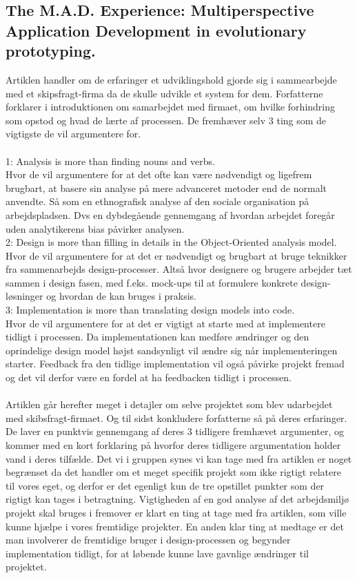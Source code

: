 \documentclass[12pt]{article}
\begin{document}
\subsection*{The M.A.D. Experience: Multiperspective Application Development in evolutionary prototyping.}

Artiklen handler om de erfaringer et udviklingshold gjorde sig i sammearbejde med et skipsfragt-firma da de skulle udvikle et system for dem. Forfatterne forklarer i introduktionen om samarbejdet med firmaet, om hvilke forhindring som opstod og hvad de lærte af processen. De fremhæver selv 3 ting som de vigtigste de vil argumentere for.\\\\
1: Analysis is more than finding nouns and verbs.\\
Hvor de vil argumentere for at det ofte kan være nødvendigt og ligefrem brugbart, at basere sin analyse på mere advanceret metoder end de normalt anvendte. Så som en ethnografisk analyse af den sociale organisation på arbejdspladsen. Dvs en dybdegående gennemgang af hvordan arbejdet foregår uden analytikerens bias påvirker analysen.\\
2: Design is more than filling in details in the Object-Oriented analysis model.\\
Hvor de vil argumentere for at det er nødvendigt og brugbart at bruge teknikker fra sammenarbejds design-processer. Altså hvor designere og brugere arbejder tæt sammen i design fasen, med f.eks. mock-ups til at formulere konkrete design-løsninger og hvordan de kan bruges i praksis.\\
3: Implementation is more than translating design models into code.\\
Hvor de vil argumentere for at  det er vigtigt at starte med at implementere tidligt i processen. Da implementationen kan medføre ændringer og den oprindelige design model højst sandsynligt vil ændre sig når implementeringen starter. Feedback fra den tidlige implementation vil også påvirke projekt fremad og det vil derfor være en fordel at ha feedbacken tidligt i processen.\\\\
Artiklen går herefter meget i detajler om selve projektet som blev udarbejdet med skibsfragt-firmaet. Og til sidst konkludere forfatterne så på deres erfaringer. De laver en punktvis gennemgang af deres 3 tidligere fremhævet argumenter, og kommer med en kort forklaring på hvorfor deres tidligere argumentation holder vand i deres tilfælde.
\newpage
Det vi i gruppen synes vi kan tage med fra artiklen er noget begrænset da det handler om et meget specifik projekt som ikke rigtigt relatere til vores eget, og derfor er det egenligt kun de tre opstillet punkter som der rigtigt kan tages i betragtning. Vigtigheden af en god analyse af det arbejdsmiljø projekt skal bruges i fremover er klart en ting at tage med fra artiklen, som ville kunne hjælpe i vores fremtidige projekter. En anden klar ting at medtage er det man involverer de fremtidige bruger i design-processen og begynder implementation tidligt, for at løbende kunne lave gavnlige ændringer til projektet.
\pagebreak
\end{document}
